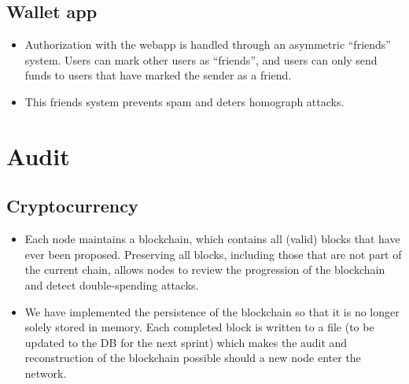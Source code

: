 \documentclass[a4paper,12pt]{article}
\begin{document}
\subsection{Wallet app}

\begin{itemize}
\item Authorization with the webapp is handled through an asymmetric ``friends'' system. Users can mark other users as ``friends'', and users can only send funds to users that have marked the sender as a friend.
\item This friends system prevents spam and deters homograph attacks.
\end{itemize}

\section{Audit}

\subsection{Cryptocurrency}

\begin{itemize}
\item Each node maintains a blockchain, which contains all (valid) blocks that have ever been proposed. Preserving all blocks, including those that are not part of the current chain, allows nodes to review the progression of the blockchain and detect double-spending attacks.
\begin{comment}
\item Miners heavily audit the work of other miners in order to maintain the integrity of the blockchain.
\item For each block a miner receives (or broadcasts), its hash will be checked to see if it satisfies a set difficulty.
\item Every transaction inside of the block is verified by checking that each input has a corresponding unspent output (UTXO), that the signature for each input was signed with the private key corresponding to the public key on the previous UTXO, and that the sum of the input amounts (from the UTXO's) is equal to the sum of the outputs.
\item If either of these checks fail, the potential new block will be rejected.
\item So long as an adversary does not control a majority of nodes in the network, blocks will not be added to the blockchain that are not correct.
\end{comment}
\item We have implemented the persistence of the blockchain so that it is no longer solely stored in memory. Each completed block is written to a file (to be updated to the DB for the next sprint) which makes the audit and reconstruction of the blockchain possible should a new node enter the network.
\end{itemize}
\end{document}
